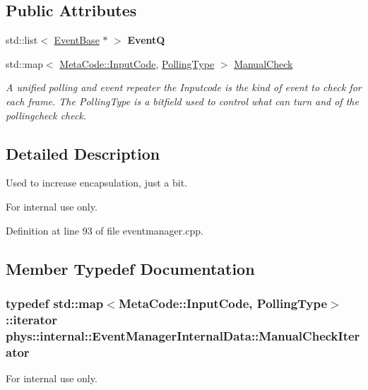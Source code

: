 \subsection*{Public Attributes}
\begin{DoxyCompactItemize}
\item 
\hypertarget{structphys_1_1internal_1_1EventManagerInternalData_a2a3389f3831cae8ded6dd0a3b6395a68}{
std::list$<$ \hyperlink{classphys_1_1EventBase}{EventBase} $\ast$ $>$ {\bfseries EventQ}}
\label{d6/d3a/structphys_1_1internal_1_1EventManagerInternalData_a2a3389f3831cae8ded6dd0a3b6395a68}

\item 
std::map$<$ \hyperlink{classphys_1_1MetaCode_a3e501cbb5bf0f6f1fdb7211465bda8d8}{MetaCode::InputCode}, \hyperlink{structphys_1_1internal_1_1EventManagerInternalData_ab9ab8380b84448aacf46a63050e159af}{PollingType} $>$ \hyperlink{structphys_1_1internal_1_1EventManagerInternalData_a717396b1782d7f491e0f085643507639}{ManualCheck}
\begin{DoxyCompactList}\small\item\em A unified polling and event repeater the Inputcode is the kind of event to check for each frame. The PollingType is a bitfield used to control what can turn and of the pollingcheck check. \item\end{DoxyCompactList}\end{DoxyCompactItemize}


\subsection{Detailed Description}
Used to increase encapsulation, just a bit. \begin{DoxyInternal}{For internal use only.}
\end{DoxyInternal}


Definition at line 93 of file eventmanager.cpp.



\subsection{Member Typedef Documentation}
\hypertarget{structphys_1_1internal_1_1EventManagerInternalData_ad2b9c7924f32e299846f1d945cb82dc0}{
\subsubsection[{ManualCheckIterator}]{\setlength{\rightskip}{0pt plus 5cm}typedef std::map$<${\bf MetaCode::InputCode}, {\bf PollingType}$>$::iterator {\bf phys::internal::EventManagerInternalData::ManualCheckIterator}}}
\label{d6/d3a/structphys_1_1internal_1_1EventManagerInternalData_ad2b9c7924f32e299846f1d945cb82dc0}
\begin{DoxyInternal}{For internal use only.}
\end{DoxyInternal}


